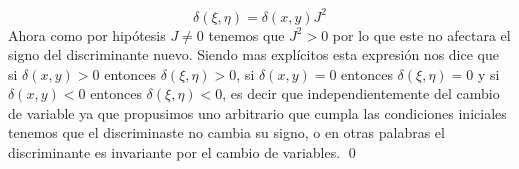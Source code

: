 \begin{homeworkProblem}
\begin{solucion}
            $$\delta(\xi,\eta)=\delta(x,y)J^2$$
            Ahora como por hipótesis $J\neq0$ tenemos que $J^2>0$ por lo que este no afectara el signo del discriminante nuevo. Siendo mas explícitos esta expresión nos dice que si $\delta(x,y)>0$ entonces $\delta(\xi,\eta)>0$, si $\delta(x,y)=0$ entonces $\delta(\xi,\eta)=0$ y si $\delta(x,y)<0$ entonces $\delta(\xi,\eta)<0$, es decir que independientemente del cambio de variable ya que propusimos uno arbitrario que cumpla las condiciones iniciales tenemos que el discriminaste no cambia su signo, o en otras palabras el discriminante es invariante por el cambio de variables. 
            \qed
    \end{solucion}
\end{homeworkProblem}
